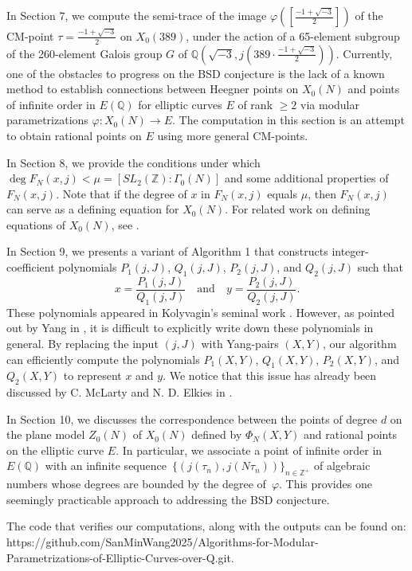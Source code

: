 \documentclass[10pt, a4paper]{article}
\begin{document}
 In Section 7, we  compute  the semi-trace of the image $\varphi ([\frac{{ - 1 + \sqrt { - 3} }}{2}])$  of  the CM-point  $\tau = \frac{-1 + \sqrt{-3}}{2}$ on  $X_{0}(389)$,  under the action of a 65-element subgroup of the 260-element Galois group $G$ of  $\mathbb{Q}\left(\sqrt{-3}, j\left(389 \cdot \frac{-1 + \sqrt{-3}}{2}\right)\right)$.
Currently, one of the obstacles to progress on the BSD conjecture is the lack of a known method to establish connections between Heegner points on $X_0(N)$ and points of infinite order in $E(\mathbb{Q})$ for elliptic curves $E$ of rank $\geq 2$ via modular parametrizations $\varphi\colon X_0(N) \to E$.
The computation in this section  is an attempt to obtain rational points on $E$ using more general CM-points.

In Section 8, we provide the conditions under which $\deg F_N(x,j)<\mu = [SL_2(\mathbb{Z}):\Gamma_0(N)]$
and some additional properties of $F_N(x,j)$. Note that
if the degree of $x$ in $F_N(x,j)$ equals $\mu$, then $F_N(x,j)$ can serve as a defining equation for $X_0(N)$. For related work on defining equations of $X_0(N)$,  see \cite{Yang}.

In Section 9, we  presents a variant of Algorithm 1 that constructs integer-coefficient polynomials $P_1(j,J)$, $Q_1(j,J)$, $P_2(j,J)$, and $Q_2(j,J)$ such that
\[
x = \frac{P_1(j,J)}{Q_1(j,J)} \quad \text{and} \quad y = \frac{P_2(j,J)}{Q_2(j,J)}.
\]
These polynomials appeared in Kolyvagin's seminal work \cite{Kolyvagin}.
However, as pointed out  by Yang  in \cite{Yang},  it is difficult to explicitly write
down these polynomials in general.
By replacing the input $(j,J)$ with Yang-pairs $(X,Y)$, our algorithm can efficiently compute the polynomials $P_1(X,Y)$, $Q_1(X,Y)$, $P_2(X,Y)$, and $Q_2(X,Y)$ to represent $x$ and $y$. 
We notice  that this issue has already been discussed by C. McLarty and  N. D. Elkies in  \cite{McLarty}.

In Section 10, we discusses the correspondence between the points of degree $d$  on the plane model $Z_0(N)$  of  $X_0(N)$  defined by $\Phi_N(X,Y)$ and rational points on the elliptic curve $E$.
In particular, we associate a point of infinite order in~\( E(\mathbb{Q}) \) with an infinite sequence~$\{ (j(\tau_n), j(N\tau_n)) \}_{n \in \mathbb{Z}^+} $ of algebraic numbers whose degrees are bounded by the degree of~$\varphi$. This provides one seemingly  practicable  approach to addressing  the BSD conjecture.

The code that verifies our computations, along with the outputs can be found on:
https://github.com/SanMinWang2025/Algorithms-for-Modular-\\
Parametrizations-of-Elliptic-Curves-over-Q.git.
\end{document}
